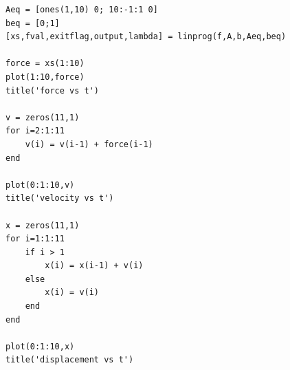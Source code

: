 \documentclass[12pt,letter]{article}
\begin{document}
\begin{enumerate}
\begin{enumerate}
\begin{verbatim}
Aeq = [ones(1,10) 0; 10:-1:1 0]
beq = [0;1]
[xs,fval,exitflag,output,lambda] = linprog(f,A,b,Aeq,beq)

force = xs(1:10)
plot(1:10,force)
title('force vs t')

v = zeros(11,1)
for i=2:1:11
    v(i) = v(i-1) + force(i-1)
end

plot(0:1:10,v)
title('velocity vs t')

x = zeros(11,1)
for i=1:1:11
    if i > 1
        x(i) = x(i-1) + v(i)
    else
        x(i) = v(i)
    end
end

plot(0:1:10,x)
title('displacement vs t')
\end{verbatim}
  \end{enumerate}
  
\end{enumerate}
\end{document}
